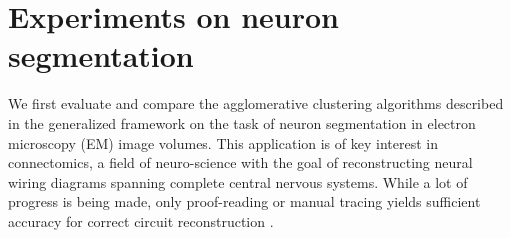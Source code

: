 


\section{Experiments on neuron segmentation}\label{sec:neuro_segm_exp}

We first evaluate and compare the agglomerative clustering algorithms described in the generalized framework on the task of neuron segmentation in electron microscopy (EM) image volumes. This application is of key interest in connectomics, a field of neuro-science with the goal of reconstructing neural wiring diagrams spanning complete central nervous systems. While a lot of progress is being made, only proof-reading or manual tracing yields sufficient accuracy for correct circuit reconstruction \cite{schlegel2017learning}.


